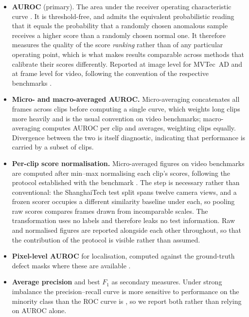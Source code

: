\documentclass[a4paper,fleqn]{cas-sc}
\begin{document}
\begin{itemize}
  \item \textbf{AUROC} (primary). The area under the receiver operating
        characteristic curve \citep{fawcett2006roc, bradley1997auc}. It is
        threshold-free, and admits the equivalent probabilistic reading that it
        equals the probability that a randomly chosen anomalous sample receives
        a higher score than a randomly chosen normal one. It therefore measures
        the quality of the score \emph{ranking} rather than of any particular
        operating point, which is what makes results comparable across methods
        that calibrate their scores differently. Reported at image level for
        MVTec~AD and at frame level for video, following the convention of the
        respective benchmarks \citep{bergmann2019mvtec, liu2018shanghaitech}.

  \item \textbf{Micro- and macro-averaged AUROC.} Micro-averaging concatenates
        all frames across clips before computing a single curve, which weights
        long clips more heavily and is the usual convention on video benchmarks;
        macro-averaging computes AUROC per clip and averages, weighting clips
        equally. Divergence between the two is itself diagnostic, indicating
        that performance is carried by a subset of clips.

  \item \textbf{Per-clip score normalisation.} Micro-averaged figures on video
        benchmarks are computed after min--max normalising each clip's scores,
        following the protocol established with the benchmark
        \citep{liu2018shanghaitech}. The step is necessary rather than
        conventional: the ShanghaiTech test split spans twelve camera views, and a frozen
        scorer occupies a different similarity baseline under each, so pooling
        raw scores compares frames drawn from incomparable scales. The
        transformation uses no labels and therefore leaks no test information.
        Raw and normalised figures are reported alongside each other throughout,
        so that the contribution of the protocol is visible rather than assumed.

  \item \textbf{Pixel-level AUROC} for localisation, computed against the
        ground-truth defect masks where these are available
        \citep{bergmann2019mvtec}.

  \item \textbf{Average precision} and best $F_1$ as secondary measures. Under
        strong imbalance the precision--recall curve is more sensitive to
        performance on the minority class than the ROC curve is
        \citep{davis2006pr}, so we report both rather than relying on AUROC
        alone.


\end{itemize}
\end{document}
